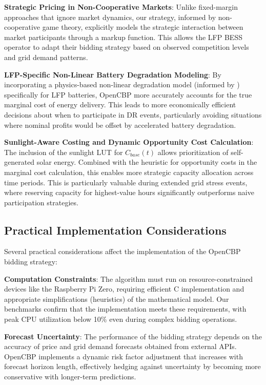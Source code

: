 \documentclass[11pt,a4paper]{article}
\begin{document}
\textbf{Strategic Pricing in Non-Cooperative Markets}: Unlike fixed-margin approaches that ignore market dynamics, our strategy, informed by non-cooperative game theory, explicitly models the strategic interaction between market participants through a markup function. This allows the LFP BESS operator to adapt their bidding strategy based on observed competition levels and grid demand patterns.

\textbf{LFP-Specific Non-Linear Battery Degradation Modeling}: By incorporating a physics-based non-linear degradation model (informed by \citet{Millner2010}) specifically for LFP batteries, OpenCBP more accurately accounts for the true marginal cost of energy delivery. This leads to more economically efficient decisions about when to participate in DR events, particularly avoiding situations where nominal profits would be offset by accelerated battery degradation.

\textbf{Sunlight-Aware Costing and Dynamic Opportunity Cost Calculation}: The inclusion of the sunlight LUT for $C_{base}(t)$ allows prioritization of self-generated solar energy. Combined with the heuristic for opportunity costs in the marginal cost calculation, this enables more strategic capacity allocation across time periods. This is particularly valuable during extended grid stress events, where reserving capacity for highest-value hours significantly outperforms naive participation strategies.

\subsection{Practical Implementation Considerations}
Several practical considerations affect the implementation of the OpenCBP bidding strategy:

\textbf{Computation Constraints}: The algorithm must run on resource-constrained devices like the Raspberry Pi Zero, requiring efficient C implementation and appropriate simplifications (heuristics) of the mathematical model. Our benchmarks confirm that the implementation meets these requirements, with peak CPU utilization below 10\% even during complex bidding operations.

\textbf{Forecast Uncertainty}: The performance of the bidding strategy depends on the accuracy of price and grid demand forecasts obtained from external APIs. OpenCBP implements a dynamic risk factor adjustment that increases with forecast horizon length, effectively hedging against uncertainty by becoming more conservative with longer-term predictions.
\end{document}

